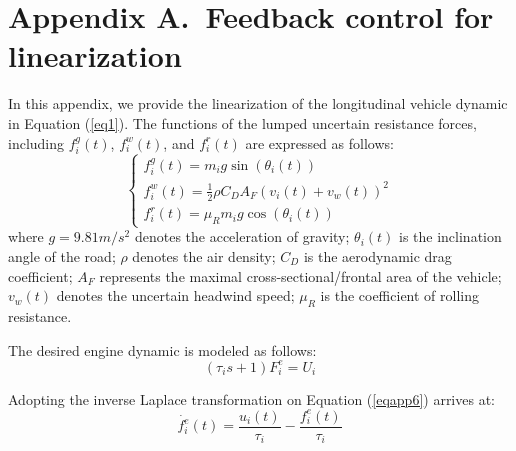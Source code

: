 \documentclass[a4paper]{cas-sc}
\begin{document}
\section*{Appendix A.~Feedback control for linearization}
\label{AppendixA}
In this appendix, we provide the linearization of the longitudinal vehicle dynamic in Equation (\ref{eq1}). The functions of the lumped uncertain resistance forces, including $f_i^g(t)$, $f_i^w(t)$, and $f_i^r(t)$ are expressed as follows:
\begin{equation}
  \left\{\begin{array}{l}
    f_{i}^{g}(t)=m_{i} g \sin \left(\theta_{i}(t)\right)                        \\
    f_{i}^{w}(t)=\frac{1}{2} \rho C_{D} A_{F}\left(v_{i}(t)+v_{w}(t)\right)^{2} \\
    f_{i}^{r}(t)=\mu_{R} m_{i} g \cos \left(\theta_{i}(t)\right)
  \end{array}\right.
  \label{eqapp5}
\end{equation}
where $g=9.81m/s^2$ denotes the acceleration of gravity; $\theta_i(t)$ is the inclination angle of the road; $\rho$ denotes the air density; $C_D$ is the aerodynamic drag coefficient; $A_F$ represents the maximal cross-sectional/frontal area of the vehicle; $v_w(t)$ denotes the uncertain headwind speed; $\mu_R$ is the coefficient of rolling resistance.

The desired engine dynamic is modeled as follows:
\begin{equation}
  (\tau_is+1)F_i^e=U_i
  \label{eqapp6}
\end{equation}

Adopting the inverse Laplace transformation on Equation (\ref{eqapp6}) arrives at:
\begin{equation}
  \dot{f_i^e}\left(t\right)=\frac{u_i(t)}{\tau_i}-\frac{f_i^e\left(t\right)}{\tau_i}
  \label{eqapp7}
\end{equation}
\end{document}
